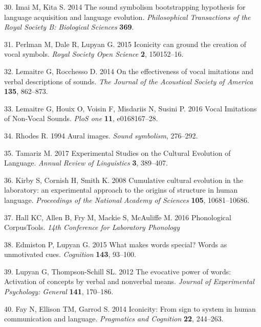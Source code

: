 \documentclass[english,floatsintext,man]{apa6}
\theoremstyle{definition}
\theoremstyle{definition}
\theoremstyle{definition}
\theoremstyle{remark}
\begin{document}
\leavevmode\hypertarget{ref-Imai:2014dea}{}%
30. Imai M, Kita S. 2014 The sound symbolism bootstrapping hypothesis
for language acquisition and language evolution. \emph{Philosophical
Transactions of the Royal Society B: Biological Sciences} \textbf{369}.

\leavevmode\hypertarget{ref-Perlman:2015ip}{}%
31. Perlman M, Dale R, Lupyan G. 2015 Iconicity can ground the creation
of vocal symbols. \emph{Royal Society Open Science} \textbf{2},
150152--16.

\leavevmode\hypertarget{ref-Lemaitre:2014kr}{}%
32. Lemaitre G, Rocchesso D. 2014 On the effectiveness of vocal
imitations and verbal descriptions of sounds. \emph{The Journal of the
Acoustical Society of America} \textbf{135}, 862--873.

\leavevmode\hypertarget{ref-Lemaitre:2016kz}{}%
33. Lemaitre G, Houix O, Voisin F, Misdariis N, Susini P. 2016 Vocal
Imitations of Non-Vocal Sounds. \emph{PloS one} \textbf{11},
e0168167--28.

\leavevmode\hypertarget{ref-Rhodes:1994au}{}%
34. Rhodes R. 1994 Aural images. \emph{Sound symbolism}, 276--292.

\leavevmode\hypertarget{ref-Tamariz:2017bd}{}%
35. Tamariz M. 2017 Experimental Studies on the Cultural Evolution of
Language. \emph{Annual Review of Linguistics} \textbf{3}, 389--407.

\leavevmode\hypertarget{ref-Kirby:2008kja}{}%
36. Kirby S, Cornish H, Smith K. 2008 Cumulative cultural evolution in
the laboratory: an experimental approach to the origins of structure in
human language. \emph{Proceedings of the National Academy of Sciences}
\textbf{105}, 10681--10686.

\leavevmode\hypertarget{ref-PCT:1.1}{}%
37. Hall KC, Allen B, Fry M, Mackie S, McAuliffe M. 2016 Phonological
CorpusTools. \emph{14th Conference for Laboratory Phonology}

\leavevmode\hypertarget{ref-Edmiston:2015he}{}%
38. Edmiston P, Lupyan G. 2015 What makes words special? Words as
unmotivated cues. \emph{Cognition} \textbf{143}, 93--100.

\leavevmode\hypertarget{ref-Lupyan:2012cp}{}%
39. Lupyan G, Thompson-Schill SL. 2012 The evocative power of words:
Activation of concepts by verbal and nonverbal means. \emph{Journal of
Experimental Psychology: General} \textbf{141}, 170--186.

\leavevmode\hypertarget{ref-Fay:2014ih}{}%
40. Fay N, Ellison TM, Garrod S. 2014 Iconicity: From sign to system in
human communication and language. \emph{Pragmatics and Cognition}
\textbf{22}, 244--263.
\end{document}
